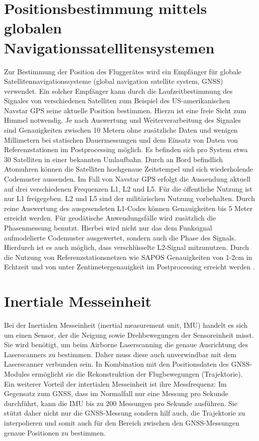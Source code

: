\documentclass[a4paper,12pt,bibliography=totoc, listof=totoc,titlepage,pointlessnumbers]{scrreprt}
\begin{document}
\section{Positionsbestimmung mittels globalen Navigationssatellitensystemen}
\label{s:GNSS}
Zur Bestimmung der Position des Fluggerätes wird ein Empfänger für globale Satellitennavigationssysteme (global navigation satellite system, GNSS) verwendet. Ein solcher Empfänger kann durch die Laufzeitbestimmung des Signales von verschiedenen Satelliten zum Beispiel des US-amerikanischen Navstar GPS seine aktuelle Position bestimmen. Hierzu ist eine freie Sicht zum Himmel notwendig. Je nach Auswertung und Weiterverarbeitung des Signales sind Genauigkeiten zwischen 10 Metern ohne zusätzliche Daten und wenigen Millimetern bei statischen Dauermessungen und dem Einsatz von Daten von Referenzstationen im Postprocessing möglich. Es befinden sich pro System etwa 30 Satelliten in einer bekannten Umlaufbahn. Durch an Bord befindlich Atomuhren können die Satelliten hochgenaue Zeitstempel und sich wiederholende Codemuster aussenden. Im Fall von Navstar GPS erfolgt die Aussendung aktuell auf drei verschiedenen Frequenzen L1, L2 und L5. Für die öffentliche Nutzung ist nur L1 freigegeben. L2 und L5 sind der militärischen Nutzung vorbehalten. Durch reine Auswertung des ausgesendeten L1-Codes können Genauigkeiten bis 5 Meter erreicht werden. Für geodätische Anwendungsfälle wird zusätzlich die Phasenmessung benutzt. Hierbei wird nicht nur das dem Funksignal aufmodelierte Codemuster ausgewertet, sondern auch die Phase des Signals. Hierdurch ist es auch möglich, dass verschlüsselte L2-Signal mitzunutzen. Durch die Nutzung von Referenzstationsnetzen wie SAPOS Genauigkeiten von 1-2cm in Echtzeit und von unter Zentimetergenauigkeit im Postprocessing erreicht werden \citep[S. 375]{Witte2006}.

\section{Inertiale Messeinheit}
\label{s:IMU}
Bei der Inertialen Messeinheit (inertial measurement unit, IMU) handelt es sich um einen Sensor, der die Neigung sowie Drehbewegungen der Sensoreinheit misst. Sie wird benötigt, um beim Airborne Laserscanning die genaue Ausrichtung des Laserscanners zu bestimmen. Daher muss diese auch unverwindbar mit dem Laserscanner verbunden sein. In Kombination mit den Positionsdaten des GNSS-Modules ermöglicht sie die Rekonstruktion der Flugbewegungen (Trajektorie). Ein weiterer Vorteil der intertialen Messeinheit ist ihre Messfrequenz: Im Gegensatz zum GNSS, dass im Normalfall nur eine Messung pro Sekunde durchführt, kann die IMU bis zu 200 Messungen pro Sekunde ausführen. Sie stützt daher nicht nur die GNSS-Messung sondern hilf auch, die Trajektorie zu interpolieren und somit auch für den Bereich zwischen den GNSS-Messungen genaue Positionen zu bestimmen. \citep[S. 23ff]{beraldin}
\end{document}

